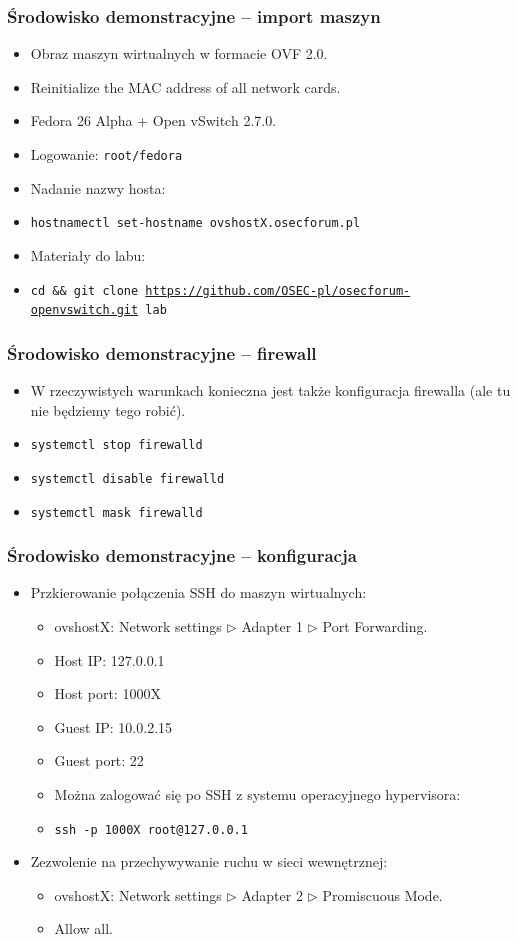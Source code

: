 \documentclass[dvipsnames,table]{beamer}
\newcommand{\tri}{$\triangleright$ }
\begin{document}
\begin{frame}
\frametitle{Środowisko demonstracyjne -- import maszyn}
\begin{itemize}
	\item Obraz maszyn wirtualnych w formacie OVF 2.0.
	\item Reinitialize the MAC address of all network cards.
	\item Fedora 26 Alpha + Open vSwitch 2.7.0.
	\item Logowanie: {\tt root/fedora}
	\item Nadanie nazwy hosta:
	\item {\tt hostnamectl set-hostname ovshostX.osecforum.pl}
	\item Materiały do labu:
	\item {\tt cd \&\& git clone \href{https://github.com/OSEC-pl/osecforum-openvswitch.git}{https://github.com/OSEC-pl/osecforum-openvswitch.git} lab}
\end{itemize}
\end{frame}

\begin{frame}
\frametitle{Środowisko demonstracyjne -- firewall}
\begin{itemize}
	\item W rzeczywistych warunkach konieczna jest także konfiguracja firewalla (ale tu nie będziemy tego robić).
	\item {\tt systemctl stop firewalld}
	\item {\tt systemctl disable firewalld}
	\item {\tt systemctl mask firewalld}
\end{itemize}
\end{frame}

\begin{frame}
\frametitle{Środowisko demonstracyjne -- konfiguracja}
\begin{itemize}
	\item Przkierowanie połączenia SSH do maszyn wirtualnych:
	\begin{itemize}
		\item ovshostX: Network settings \tri Adapter 1 \tri Port Forwarding.
		\item Host IP: 127.0.0.1
		\item Host port: 1000X
		\item Guest IP: 10.0.2.15
		\item Guest port: 22
		\item Można zalogować się po SSH z systemu operacyjnego hypervisora:
		\item {\tt ssh -p 1000X root@127.0.0.1}
	\end{itemize}
	\item Zezwolenie na przechywywanie ruchu w sieci wewnętrznej:
	\begin{itemize}
		\item ovshostX: Network settings \tri Adapter 2 \tri Promiscuous Mode.
		\item Allow all. 
	\end{itemize}
\end{itemize}
\end{frame}
\end{document}
